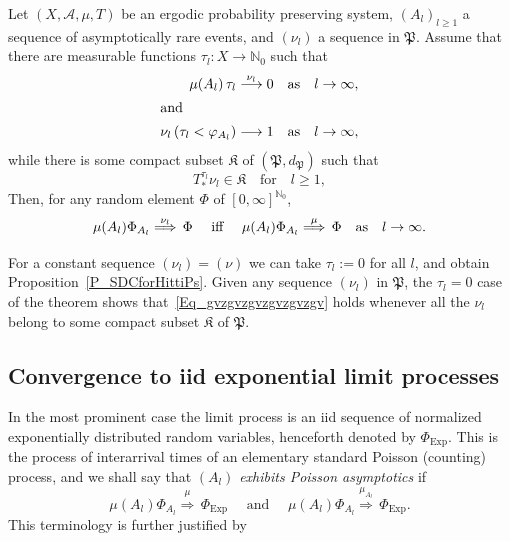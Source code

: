 \documentclass[AHL,Unicode,longabstracts]{cedram}
\newcommand{\clA}{\mathcal{A}}
\newcommand{\Expl}{\mathrm{Exp}}
\newcommand{\frkK}{\mathfrak{K}}
\newcommand{\frkP}{\mathfrak{P}}
\newcommand{\bbN}{\mathbb{N}}
\begin{document}
\begin{theo}\label{T_ProcessesAsymptoticToHittingTimeProc}
Let $(X,\clA,\mu,T)$ be an ergodic probability preserving system, $(A_{l})_{l\geq1}$ a sequence of asymptotically rare events, and $(\nu_{l})$ a sequence in $\frkP$. Assume that there are measurable functions $\tau_{l}:X\rightarrow
\bbN_{0}$ such that
\begin{align}
\mu(A_{l})\,\tau_{l}\overset{\nu_{l}}{\longrightarrow}0\quad &\text{as}\quad l\rightarrow\infty, \label{Eq_kllklklklklk}
\\
\intertext{and}
\nu_{l}\left(\tau_{l}<\varphi_{A_{l}}\right) \longrightarrow1\quad &\text{as}\quad l\rightarrow\infty,\label{Eq_opopopopo}
\end{align}
while there is some compact subset $\frkK$ of $(\frkP,d_{\frkP})$ such that
\begin{equation}\label{Eq_hbhbhbhbhbkkkk}
T_{\ast}^{\tau_{l}}\nu_{l}\in\frkK \quad\text{for}\quad l\geq1,
\end{equation}
Then, for any random element $\Phi$ of $[0,\infty]^{\bbN_{0}}$,
\begin{equation}\label{Eq_gvzgvzgvzgvzgvzgv}
\mu(A_{l})\Phi_{A_{l}}\overset{\nu_{l}}{\Longrightarrow}\,\Phi\quad\text{  iff
\quad}\mu(A_{l})\Phi_{A_{l}}\overset{\mu}{\Longrightarrow}\,\Phi\quad\text{as}\quad l\rightarrow\infty. 
\end{equation}
\end{theo}



\begin{rema}
For a constant sequence $(\nu_{l})=(\nu)$ we can take $\tau_{l}:=0$ for all
$l$, and obtain Proposition~\ref{P_SDCforHittiPs}. Given any sequence $(\nu_{l})$ in $\frkP$, the $\tau_{l}=0$ case of the theorem shows that~\eqref{Eq_gvzgvzgvzgvzgvzgv} holds whenever all the $\nu_{l}$ belong to some compact subset $\frkK$ of $\frkP$.
\end{rema}



\subsection{Convergence to iid exponential limit processes}
In the most prominent case the limit process is an iid sequence of normalized exponentially distributed random variables, henceforth denoted by $\Phi_{\Expl}$. This is the process of interarrival times of an elementary standard Poisson (counting) process, and we shall say that $(A_{l})$ \emph{exhibits Poisson asymptotics} if
\begin{equation}\label{Eq_DefPoissonAsymptotics}
\mu(A_{l})\Phi_{A_{l}}\overset{\mu}{\Longrightarrow}\,\Phi_{\Expl }\quad\text{  and }\quad\mu(A_{l})\Phi_{A_{l}}\overset{\mu_{A_{l}} }{\Longrightarrow}\,\Phi_{\Expl}.
\end{equation}
This terminology is further justified by
\end{document}

